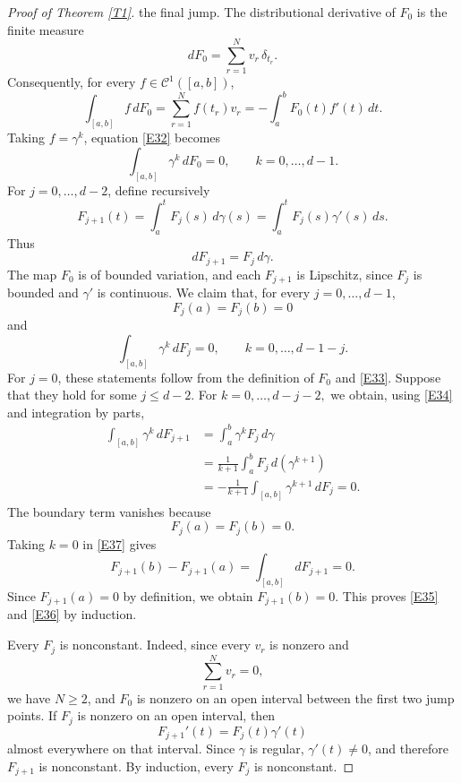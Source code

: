 \documentclass[10pt,a4paper]{amsart}
\newcommand{\cC}{\mathcal{C}}
\numberwithin{equation}{section}
\begin{document}
\begin{proof}[Proof of Theorem \ref{T1}]
the final jump. The distributional derivative of $F_0$ is the finite measure
\[dF_0=\sum_{r=1}^N v_r\,\delta_{t_r}.\]
Consequently, for every $f\in \cC^1([a,b])$,
\[\int_{[a,b]} f\,dF_0=\sum_{r=1}^N f(t_r)v_r=-\int_a^b F_0(t)f'(t)\,dt.\]
Taking $f=\gamma^k$, equation
\eqref{E32} becomes
\begin{equation}
    \int_{[a,b]}\gamma^k\,dF_0=0,
    \qquad
    k=0,\ldots,d-1.
    \label{E33}
\end{equation}
For $j=0,\ldots,d-2$, define recursively
\begin{equation} F_{j+1}(t)=\int_a^t F_j(s)\,d\gamma(s)=\int_a^t F_j(s)\gamma'(s)\,ds.
    \label{E34}
\end{equation}
Thus
\[
    dF_{j+1}=F_j\,d\gamma.
\]
The map $F_0$ is of bounded variation, and each $F_{j+1}$ is
Lipschitz, since $F_j$ is bounded and $\gamma'$ is continuous.
We claim that, for every $j=0,\ldots,d-1$,
\begin{equation}
    F_j(a)=F_j(b)=0
    \label{E35}
\end{equation}
and
\begin{equation}
    \int_{[a,b]}\gamma^k\,dF_j=0,
    \qquad
    k=0,\ldots,d-1-j.
    \label{E36}
\end{equation}
For $j=0$, these statements follow from the definition of $F_0$ and \eqref{E33}. Suppose that they hold for some $j\leq d-2$. For $k=0,\ldots,d-j-2,$ we obtain, using \eqref{E34} and integration by parts,
\begin{align}
    \int_{[a,b]}\gamma^k\,dF_{j+1}
    &=\int_a^b \gamma^k F_j\,d\gamma\nonumber\\
    &=\frac{1}{k+1}
    \int_a^b F_j\,d(\gamma^{k+1})\nonumber\\
    &=-\frac{1}{k+1}\int_{[a,b]}\gamma^{k+1}\,dF_j
    =0.
    \label{E37}
\end{align}
The boundary term vanishes because
\[F_j(a)=F_j(b)=0.\]
Taking $k=0$ in \eqref{E37} gives
\[F_{j+1}(b)-F_{j+1}(a)=\int_{[a,b]}dF_{j+1}=0.\]
Since $F_{j+1}(a)=0$ by definition, we obtain $F_{j+1}(b)=0$. This proves \eqref{E35} and \eqref{E36} by induction.

Every $F_j$ is nonconstant. Indeed, since every $v_r$ is nonzero and
\[\sum_{r=1}^N v_r=0,\]
we have $N\geq2$, and $F_0$ is nonzero on an open interval between
the first two jump points. If $F_j$ is nonzero on an open interval,
then
\[F_{j+1}'(t)=F_j(t)\gamma'(t)\]
almost everywhere on that interval. Since $\gamma$ is regular,
$\gamma'(t)\neq0$, and therefore $F_{j+1}$ is nonconstant. By
induction, every $F_j$ is nonconstant.


\end{proof}
\end{document}
